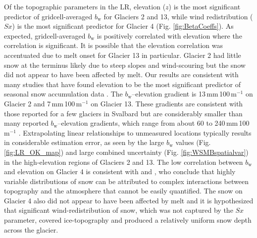 \documentclass[review,oneside, letterpaper]{igs}
\begin{document}
Of the topographic parameters in the LR, elevation ($z$) is the most significant predictor of gridcell-averaged $b_\mathrm{w}$ for Glaciers 2 and 13, while wind redistribution ($Sx$) is the most significant predictor for Glacier 4 (Fig. \ref{fig:BetaCoeffs}). As expected, gridcell-averaged $b_\mathrm{w}$ is positively correlated with elevation where the correlation is significant. It is possible that the elevation correlation was accentuated due to melt onset for Glacier 13 in particular. Glacier 2 had little snow at the terminus likely due to steep slopes and wind-scouring but the snow did not appear to have been affected by melt.  Our results are consistent with many studies that have found elevation to be the most significant predictor of seasonal snow accumulation data \citep[e.g.][]{Machguth2006, Grunewald2014, McGrath2015}. The $b_\mathrm{w}$--elevation gradient is 13\,mm\,100\,m$^{-1}$ on Glacier 2 and 7\,mm\,100\,m$^{-1}$ on Glacier 13. These gradients are consistent with those reported for a few glaciers in Svalbard \citep{Winther1998} but are considerably smaller than many reported $b_\mathrm{w}$--elevation gradients, which range from about 60 to 240\,mm\,100\,m$^{-1}$ \citep[e.g.][]{Hagen1990,Tveit1996,Winther1998}. Extrapolating linear relationships to unmeasured locations typically results in considerable estimation error, as seen by the large $b_\mathrm{w}$ values (Fig. \ref{fig:LR_OK_map}) and large combined uncertainty (Fig. \ref{fig:WSMBspatialvar}) in the high-elevation regions of Glaciers 2 and 13. The low correlation between $b_\mathrm{w}$ and elevation on Glacier 4 is consistent with \cite{Grabiec2011} and \cite{Lopez2011}, who conclude that highly variable distributions of snow can be attributed to complex interactions between topography and the atmosphere that cannot be easily quantified. The snow on Glacier 4 also did not appear to have been affected by melt and it is hypothesized that significant wind-redistribution of snow, which was not captured by the $Sx$ parameter, covered ice-topography and produced a relatively uniform snow depth across the glacier.
\end{document}
